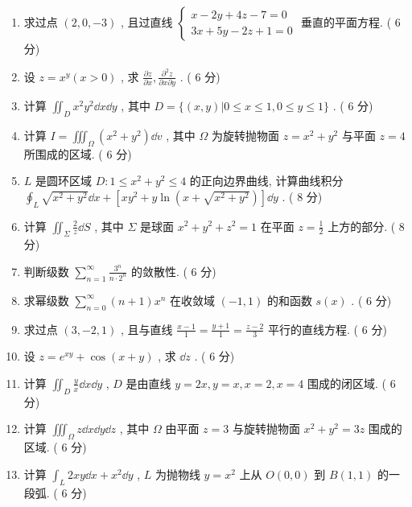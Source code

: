 \begin{enumerate}
	\item 求过点 $(2,0,-3)$ , 且过直线 $\begin{cases}
	x-2 y+4 z-7=0\\
	3 x+5 y-2 z+1=0
	\end{cases}$ 垂直的平面方程. ( $6$ 分)
	
	\item 设 $z=x^{y}(x>0)$ , 求 $\frac{\partial z}{\partial x}, \frac{\partial^{2} z}{\partial x \partial y}$ . ( $6$ 分)
	
	\item 计算 $\iint_{D} x^{2} y^{2} \dd x \dd y$ , 其中 $D=\{(x, y) | 0 \leq x \leq 1,0 \leq y \leq 1\}$ . ( $6$ 分)
	
	\item 计算 $I=\iiint_{\Omega}\left(x^{2}+y^{2}\right) \dd v$ , 其中 $\Omega$ 为旋转抛物面 $z=x^{2}+y^{2}$ 与平面 $z=4$ 所围成的区域. ( $6$ 分)
	
	\item $L$ 是圆环区域 $D : 1 \leq x^{2}+y^{2} \leq 4$ 的正向边界曲线, 计算曲线积分 $\oint_{L} \sqrt{x^{2}+y^{2}} \dd x+\left[x y^{2}+y \ln \left(x+\sqrt{x^{2}+y^{2}}\right)\right] \dd y$ . ( $8$ 分)
	
	\item 计算 $\iint_{\Sigma} \frac{2}{z} \dd S$ , 其中 $\Sigma$ 是球面 $x^{2}+y^{2}+z^{2}=1$ 在平面 $z=\frac{1}{2}$ 上方的部分. ( $8$ 分)
	
	\item 判断级数 $\sum_{n=1}^{\infty} \frac{3^{n}}{n \cdot 2^{n}}$ 的敛散性. ( $6$ 分)
	
	\item 求幂级数 $\sum_{n=0}^{\infty}(n+1) x^{n}$ 在收敛域 $(-1,1)$ 的和函数 $s(x)$ . ( $6$ 分)
	
	\item 求过点 $(3,-2,1)$ ,  且与直线 $\frac{x-1}{1}=\frac{y+1}{1}=\frac{z-2}{3}$ 平行的直线方程. ( $6$ 分)
	
	\item 设 $ z = e^{xy} + \cos(x + y)$ , 求 $\dd z$ . ( $6$ 分)
	
	\item 计算 $\iint_{D}\frac{y}{x}\dd x\dd y$ , $D$ 是由直线 $ y = 2x,y = x, x = 2, x = 4$ 围成的闭区域. ( $6$ 分)
	
	\item 计算 $\iiint_{\Omega}z\dd x\dd y\dd z$ , 其中 $\Omega$ 由平面 $z = 3$ 与旋转抛物面 $x^2 + y^2 = 3z$ 围成的区域. ( $6$ 分)
	
	\item 计算 $\int_{L} 2 x y \dd x+x^{2} \dd y$ , $L$  为抛物线 $y=x^{2}$ 上从 $O(0,0)$ 到 $B(1,1)$ 的一段弧. ( $6$ 分)
	

\end{enumerate}
